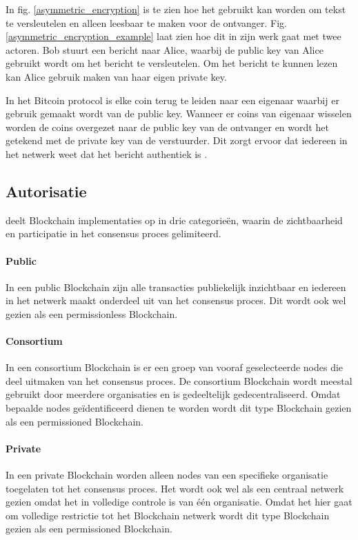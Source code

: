 In fig. \ref{asymmetric_encryption} is te zien hoe het gebruikt kan worden om tekst te versleutelen en alleen leesbaar te maken voor de ontvanger. Fig. \ref{asymmetric_encryption_example} laat zien hoe dit in zijn werk gaat met twee actoren. Bob stuurt een bericht naar Alice, waarbij de public key van Alice gebruikt wordt om het bericht te versleutelen. Om het bericht te kunnen lezen kan Alice gebruik maken van haar eigen private key. 

\newpage
In het Bitcoin protocol is elke coin terug te leiden naar een eigenaar waarbij er gebruik gemaakt wordt van de public key. Wanneer er coins van eigenaar wisselen worden de coins overgezet naar de public key van de ontvanger en wordt het getekend met de private key van de verstuurder. Dit zorgt ervoor dat iedereen in het netwerk weet dat het bericht authentiek is \citep[``How bitcoin works'']{bitcoin_wiki}.

\subsection{Autorisatie}

\cite{zheng2017overview} deelt Blockchain implementaties op in drie categorieën, waarin de zichtbaarheid en participatie in het consensus proces gelimiteerd.

\paragraph{Public} In een public Blockchain zijn alle transacties publiekelijk inzichtbaar en iedereen in het netwerk maakt onderdeel uit van het consensus proces. Dit wordt ook wel gezien als een permissionless Blockchain.

\paragraph{Consortium} In een consortium Blockchain is er een groep van vooraf geselecteerde nodes die deel uitmaken van het consensus proces. De consortium Blockchain wordt meestal gebruikt door meerdere organisaties en is gedeeltelijk gedecentraliseerd. Omdat bepaalde nodes geïdentificeerd dienen te worden wordt dit type Blockchain gezien als een permissioned Blockchain.

\paragraph{Private} In een private Blockchain worden alleen nodes van een specifieke organisatie toegelaten tot het consensus proces. Het wordt ook wel als een centraal netwerk gezien omdat het in volledige controle is van één organisatie. Omdat het hier gaat om volledige restrictie tot het Blockchain netwerk wordt dit type Blockchain gezien als een permissioned Blockchain.

